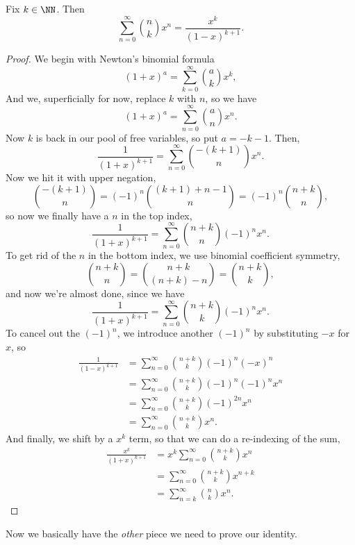 \documentclass{article}
\begin{document}
\begin{theorem}
    Fix $k \in \NN$.
    Then
    \[
        \sum_{n=0}^\infty \binom{n}{k} x^n = \frac{x^k}{(1-x)^{k+1}}.
    \]
\end{theorem}
\begin{proof}
    We begin with Newton's binomial formula
    \[
        (1+x)^a = \sum_{k=0}^\infty \binom{a}{k} x^k,
    \]
    And we, superficially for now, replace $k$ with $n$, so we have
    \[
        (1+x)^a = \sum_{n=0}^\infty \binom{a}{n} x^n.
    \]
    Now $k$ is back in our pool of free variables, so put $a = -k-1$.
    Then,
    \[
        \frac{1}{(1+x)^{k+1}} = \sum_{n=0}^\infty \binom{-(k+1)}{n} x^n.
    \]
    Now we hit it with upper negation,
    \[
        \binom{-(k+1)}{n} = (-1)^n\binom{(k+1)+n-1}{n} = (-1)^n \binom{n+k}{n},
    \]
    so now we finally have a $n$ in the top index,
    \[
        \frac{1}{(1+x)^{k+1}} = \sum_{n=0}^\infty \binom{n+k}{n}(-1)^n x^n.
    \]
    To get rid of the $n$ in the bottom index, we use binomial coefficient symmetry,
    \[
        \binom{n+k}{n} = \binom{n+k}{(n+k)-n}= \binom{n+k}{k},
    \]
    and now we're almost done, since we have
    \[
        \frac{1}{(1+x)^{k+1}} = \sum_{n=0}^\infty \binom{n+k}{k}(-1)^n x^n.
    \]
    To cancel out the $(-1)^n$, we introduce another $(-1)^n$ by substituting $-x$ for $x$, so 
    \begin{align*}
        \frac{1}{(1-x)^{k+1}} &= \sum_{n=0}^\infty \binom{n+k}{k}(-1)^n (-x)^n \\
                              &= \sum_{n=0}^\infty \binom{n+k}{k}(-1)^n(-1)^n x^n \\
                              &= \sum_{n=0}^\infty \binom{n+k}{k}(-1)^{2n} x^n \\
                              &= \sum_{n=0}^\infty \binom{n+k}{k}x^n.
    \end{align*}
    And finally, we shift by a $x^k$ term, so that we can do a re-indexing of the sum,
    \begin{align*}
        \frac{x^k}{(1+x)^{k+1}} &= x^k\sum_{n=0}^\infty \binom{n+k}{k} x^n \\
                                &= \sum_{n=0}^\infty \binom{n+k}{k} x^{n+k} \\
                                &= \sum_{n=k}^\infty \binom{n}{k} x^{n}.
    \end{align*}
\end{proof}

Now we basically have the \textit{other} piece we need to prove our identity.
\end{document}
